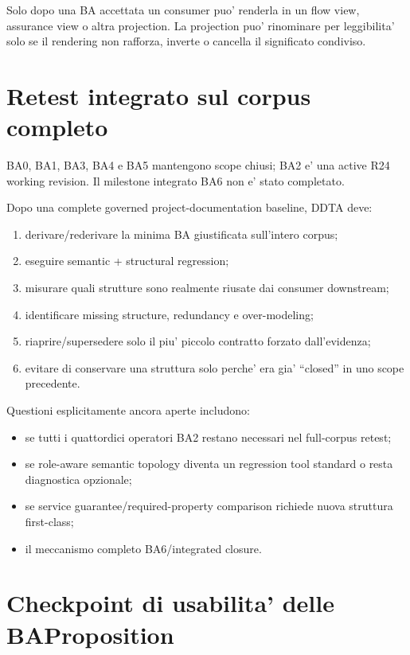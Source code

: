 \documentclass[11pt,a4paper]{article}
\begin{document}
Solo dopo una BA accettata un consumer puo' renderla in un flow view, assurance view o altra projection. La projection puo' rinominare per leggibilita' solo se il rendering non rafforza, inverte o cancella il significato condiviso.

\section{Retest integrato sul corpus completo}

\begin{statusopen}
BA0, BA1, BA3, BA4 e BA5 mantengono scope chiusi; BA2 e' una active R24 working revision. Il milestone integrato BA6 non e' stato completato.
\end{statusopen}

Dopo una complete governed project-documentation baseline, DDTA deve:

\begin{enumerate}
\item derivare/rederivare la minima BA giustificata sull'intero corpus;
\item eseguire semantic + structural regression;
\item misurare quali strutture sono realmente riusate dai consumer downstream;
\item identificare missing structure, redundancy e over-modeling;
\item riaprire/supersedere solo il piu' piccolo contratto forzato dall'evidenza;
\item evitare di conservare una struttura solo perche' era gia' ``closed'' in uno scope precedente.
\end{enumerate}

Questioni esplicitamente ancora aperte includono:

\begin{itemize}
\item se tutti i quattordici operatori BA2 restano necessari nel full-corpus retest;
\item se role-aware semantic topology diventa un regression tool standard o resta diagnostica opzionale;
\item se service guarantee/required-property comparison richiede nuova struttura first-class;
\item il meccanismo completo BA6/integrated closure.
\end{itemize}


\section{Checkpoint di usabilita' delle BAProposition}
\end{document}
